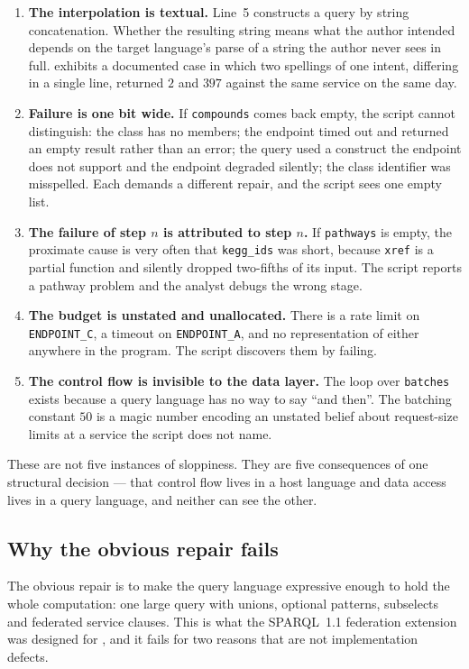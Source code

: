 \begin{enumerate}[label=(D\arabic*),leftmargin=3em]
\item \textbf{The interpolation is textual.} Line~5 constructs a query by
string concatenation. Whether the resulting string means what the author
intended depends on the target language's parse of a string the author never
sees in full.  exhibits a documented case in which two
spellings of one intent, differing in a single line, returned $2$ and $397$
against the same service on the same day.
\item \textbf{Failure is one bit wide.} If \texttt{compounds} comes back empty,
the script cannot distinguish: the class has no members; the endpoint timed out
and returned an empty result rather than an error; the query used a construct
the endpoint does not support and the endpoint degraded silently; the class
identifier was misspelled. Each demands a different repair, and the script sees
one empty list.
\item \textbf{The failure of step $n$ is attributed to step $n$.} If
\texttt{pathways} is empty, the proximate cause is very often that
\texttt{kegg\_ids} was short, because \texttt{xref} is a partial function and
silently dropped two-fifths of its input. The script reports a pathway problem
and the analyst debugs the wrong stage.
\item \textbf{The budget is unstated and unallocated.} There is a rate limit on
\texttt{ENDPOINT\_C}, a timeout on \texttt{ENDPOINT\_A}, and no representation
of either anywhere in the program. The script discovers them by failing.
\item \textbf{The control flow is invisible to the data layer.} The loop over
\texttt{batches} exists because a query language has no way to say ``and
then''. The batching constant $50$ is a magic number encoding an unstated
belief about request-size limits at a service the script does not name.
\end{enumerate}

These are not five instances of sloppiness. They are five consequences of one
structural decision --- that control flow lives in a host language and data
access lives in a query language, and neither can see the other.

\subsection{Why the obvious repair fails}

The obvious repair is to make the query language expressive enough to hold the
whole computation: one large query with unions, optional patterns, subselects
and federated service clauses. This is what the SPARQL~1.1 federation extension
was designed for \citep{Prudhommeaux2013Federated,Harris2013}, and it fails for
two reasons that are not implementation defects.

